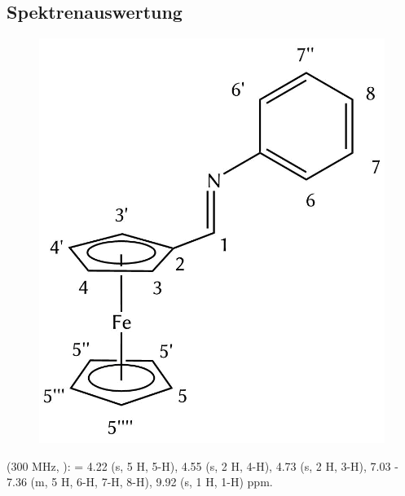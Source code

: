 \documentclass[12pt]{article}
\begin{document}
\begin{onehalfspace}
\section{Spektrenauswertung}
\begin{figure}[!ht]
   \centering
\includegraphics[scale=0.3]{auswert.png}
\end{figure}
\noindent
\textbf{} (300 MHz, ): \ce{$\delta$} = 
4.22 (s, 5 H, 5-H),
4.55 (s, 2 H, 4-H),
4.73 (s, 2 H, 3-H),
7.03 - 7.36 (m, 5 H, 6-H, 7-H, 8-H),
9.92 (s, 1 H, 1-H) ppm.

\end{onehalfspace}
\end{document}
